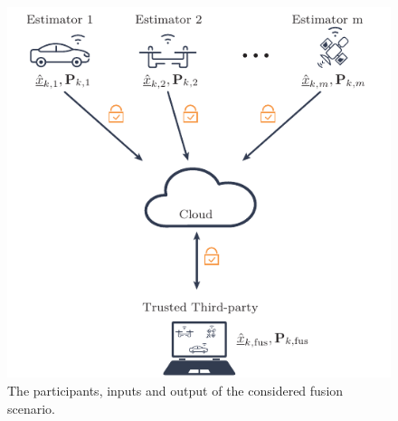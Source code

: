 \documentclass[letterpaper, 10 pt, conference]{ieeeconf}
\begin{document}
\begin{figure}[t]
    \centering
    \includegraphics{figures/illustration.pdf}%
    \caption{The participants, inputs and output of the considered fusion scenario.}\vspace{-\baselineskip}%
    \label{fig:layout}%
\end{figure}%
\end{document}
